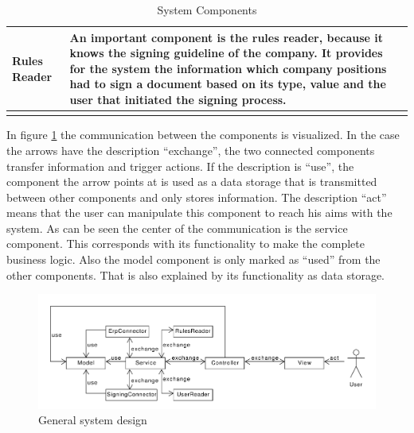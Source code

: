 \begin{longtable}{|p{4cm}|p{11cm}|}
		Rules Reader & An important component is the rules reader, because it knows the signing guideline of the company. It provides for the system the information which company positions had to sign a document based on its type, value and the user that initiated the signing process.\\ \hline
		\caption{System Components}
		\label{tab:listingSystemComponents}
	\end{longtable}

In figure \ref{fig:generalDesign} the communication between the components is visualized.
In the case the arrows have the description ``exchange'', the two connected components transfer information and trigger actions. If the description is ``use'', the component the arrow points at is used as a data storage that is transmitted between other components and only stores information.  The description ``act'' means that the user can manipulate this component to reach his aims with the system. \newline
As can be seen the center of the communication is the service component. This corresponds with its functionality to make the complete business logic. Also the model component is only marked as ``used'' from the other components. That is also explained by its functionality as data storage.  

\begin{figure}[h!]
	\includegraphics[width=\linewidth]{./design/images/generalCommunication.pdf}
	\centering
	\caption{General system design}
	\label{fig:generalDesign}
\end{figure}

